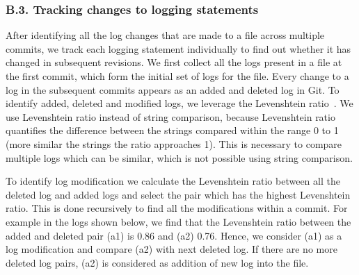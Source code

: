 \subsubsection*{B.3. Tracking changes to logging statements}
After identifying all the log changes that are made to a file across multiple commits, we track each logging statement individually to find out whether it has changed in subsequent revisions. We first collect all the logs present in a file at the first commit, which form the initial set of logs for the file. Every change to a log in the subsequent commits appears as an added and deleted log in Git. To identify added, deleted and modified logs, we leverage the Levenshtein ratio~\cite{levenshteinratio}. We use Levenshtein ratio instead of string comparison, because Levenshtein ratio quantifies the difference between the strings compared within the range 0 to 1 (more similar the strings the ratio approaches 1). This is necessary to compare multiple logs which can be similar, which is not possible using string comparison.




To identify log modification we calculate the Levenshtein ratio between all the deleted log and added logs and select the pair which has the highest Levenshtein ratio. This is done recursively to find all the modifications within a commit. For example in the logs shown below, we find that the Levenshtein ratio between the added and deleted pair (a1) is 0.86 and (a2) 0.76. Hence, we consider (a1) as a log modification and compare (a2) with next deleted log. If there are no more deleted log pairs, (a2) is considered as addition of new log into the file. 

